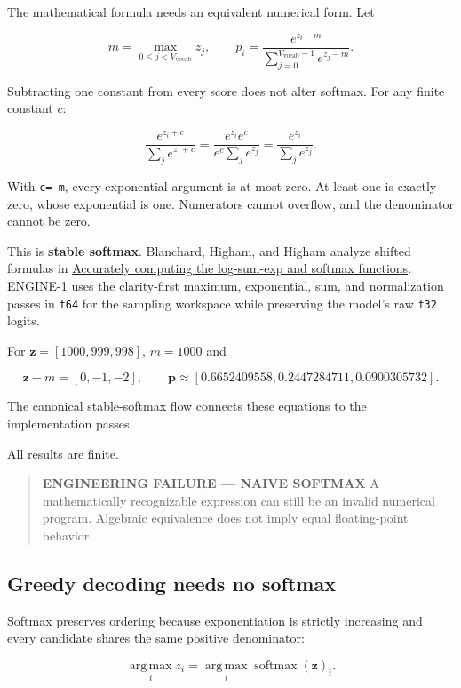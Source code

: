 \documentclass[
  10pt,
]{article}
\begin{document}
The mathematical formula needs an equivalent numerical form. Let

\[
m=\max_{0\le j<V_{\mathrm{vocab}}}z_j,
\qquad
p_i=\frac{e^{z_i-m}}
{\sum_{j=0}^{V_{\mathrm{vocab}}-1}e^{z_j-m}}.
\]

Subtracting one constant from every score does not alter softmax. For
any finite constant \(c\):

\[
\frac{e^{z_i+c}}{\sum_j e^{z_j+c}}
=\frac{e^{z_i}e^c}{e^c\sum_j e^{z_j}}
=\frac{e^{z_i}}{\sum_j e^{z_j}}.
\]

With \texttt{c=-m}, every exponential argument is at most zero. At least
one is exactly zero, whose exponential is one. Numerators cannot
overflow, and the denominator cannot be zero.

This is \textbf{stable softmax}. Blanchard, Higham, and Higham analyze
shifted formulas in
\href{https://doi.org/10.1093/imanum/draa038}{Accurately computing the
log-sum-exp and softmax functions}. ENGINE-1 uses the clarity-first
maximum, exponential, sum, and normalization passes in \texttt{f64} for
the sampling workspace while preserving the model's raw \texttt{f32}
logits.

For \(\mathbf{z}=[1000,999,998]\), \(m=1000\) and

\[
\mathbf{z}-m=[0,-1,-2],\qquad
\mathbf{p}\approx[0.6652409558,0.2447284711,0.0900305732].
\]

The canonical
\href{https://github.com/hermonai/inside-the-llm-engine/blob/astra-visual-rewrite/diagrams/sampling/stable-softmax.txt}{stable-softmax
flow} connects these equations to the implementation passes.

All results are finite.

\begin{quote}
\textbf{ENGINEERING FAILURE --- NAIVE SOFTMAX} A mathematically
recognizable expression can still be an invalid numerical program.
Algebraic equivalence does not imply equal floating-point behavior.
\end{quote}

\subsection{Greedy decoding needs no
softmax}\label{greedy-decoding-needs-no-softmax}

Softmax preserves ordering because exponentiation is strictly increasing
and every candidate shares the same positive denominator:

\[
\operatorname*{arg\,max}_i z_i
=\operatorname*{arg\,max}_i \operatorname{softmax}(\mathbf{z})_i.
\]
\end{document}
